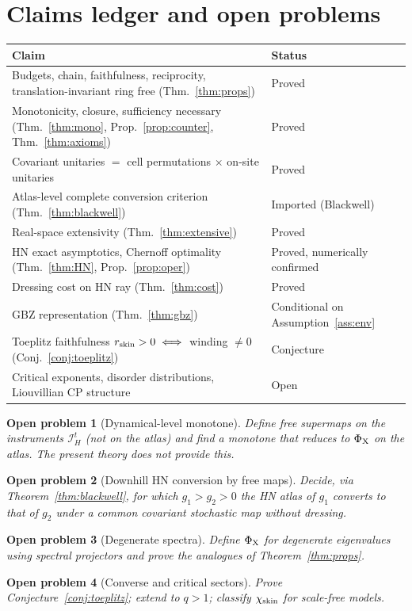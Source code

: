 \documentclass[11pt]{article}
\newtheorem{openproblem}{Open problem}
\newcommand{\rskin}{r_{\rm skin}}
\newcommand{\PhiX}{\Phi_{\rm X}}
\begin{document}
\section{Claims ledger and open problems}\label{sec:ledger}
\begin{center}
\small
\begin{tabular}{@{}p{}p{}@{}}
\toprule
Claim & Status\\
\midrule
Budgets, chain, faithfulness, reciprocity, translation-invariant ring free (Thm.~\ref{thm:props}) & Proved\\
Monotonicity, closure, sufficiency necessary (Thm.~\ref{thm:mono}, Prop.~\ref{prop:counter}, Thm.~\ref{thm:axioms}) & Proved\\
Covariant unitaries $=$ cell permutations $\times$ on-site unitaries & Proved\\
Atlas-level complete conversion criterion (Thm.~\ref{thm:blackwell}) & Imported (Blackwell)\\
Real-space extensivity (Thm.~\ref{thm:extensive}) & Proved\\
HN exact asymptotics, Chernoff optimality (Thm.~\ref{thm:HN}, Prop.~\ref{prop:oper}) & Proved, numerically confirmed\\
Dressing cost on HN ray (Thm.~\ref{thm:cost}) & Proved\\
GBZ representation (Thm.~\ref{thm:gbz}) & Conditional on Assumption~\ref{ass:env}\\
Toeplitz faithfulness $\rskin>0\iff$ winding $\ne0$ (Conj.~\ref{conj:toeplitz}) & Conjecture\\
Critical exponents, disorder distributions, Liouvillian CP structure & Open\\
\bottomrule
\end{tabular}
\end{center}

\begin{openproblem}[Dynamical-level monotone]\label{op:dyn}
Define free supermaps on the instruments $\mathcal I_H^t$ (not on the atlas) and find a monotone that reduces to $\PhiX$ on the atlas. The present theory does not provide this.
\end{openproblem}
\begin{openproblem}[Downhill HN conversion by free maps]\label{op:downhill}
Decide, via Theorem~\ref{thm:blackwell}, for which $g_1>g_2>0$ the HN atlas of $g_1$ converts to that of $g_2$ under a common covariant stochastic map without dressing.
\end{openproblem}
\begin{openproblem}[Degenerate spectra]\label{op:degenerate}
Define $\PhiX$ for degenerate eigenvalues using spectral projectors and prove the analogues of Theorem~\ref{thm:props}.
\end{openproblem}
\begin{openproblem}[Converse and critical sectors]
Prove Conjecture~\ref{conj:toeplitz}; extend to $q>1$; classify $\chi_{\rm skin}$ for scale-free models.
\end{openproblem}
\end{document}
